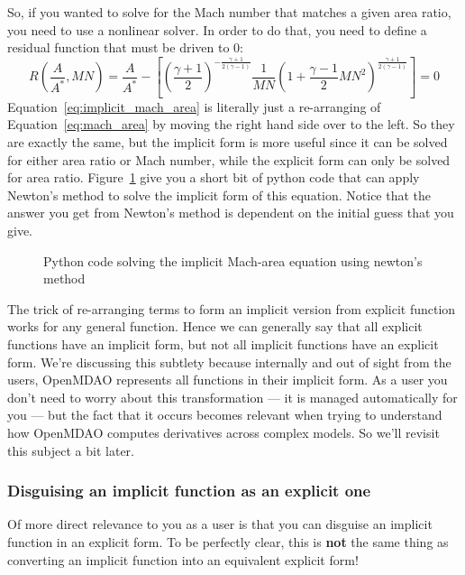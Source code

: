 \documentclass[conf]{new-aiaa}
\begin{document}
So, if you wanted to solve for the Mach number that matches a given area ratio, you need to use a nonlinear solver. 
In order to do that, you need to define a residual function that must be driven to 0: 
\begin{equation}
    R(\frac{A}{A^*}, MN) = \frac{A}{A^*} - \left[ \left(\frac{\gamma+1}{2}\right)^{-\frac{\gamma+1}{2(\gamma-1)}} 
                    \frac{1}{MN} 
                    \left( 1 + \frac{\gamma-1}{2}MN^2 \right)^{\frac{\gamma+1}{2(\gamma-1)}}\right] = 0
                    \label{eq:implicit_mach_area}
\end{equation}
Equation~\eqref{eq:implicit_mach_area} is literally just a re-arranging of Equation~\eqref{eq:mach_area} by moving the right hand side over to the left. 
So they are exactly the same, but the implicit form is more useful since it can be solved for either area ratio or Mach number, while the explicit form can only be solved for area ratio. 
Figure~\ref{fig:mach-area-implicit} give you a short bit of python code that can apply Newton's method to solve the implicit form of this equation. 
Notice that the answer you get from Newton's method is dependent on the initial guess that you give.
\begin{figure}[H]
    \centering
    
    \caption{Python code solving the implicit Mach-area equation using newton's method}
    \label{fig:mach-area-implicit}
\end{figure}

The trick of re-arranging terms to form an implicit version from explicit function works for any general function.
Hence we can generally say that all explicit functions have an implicit form, but not all implicit functions have an explicit form. 
We're discussing this subtlety because internally and out of sight from the users, OpenMDAO represents all functions in their implicit form. 
As a user you don't need to worry about this transformation --- it is managed automatically for you --- but the fact that it occurs becomes relevant when trying to understand how OpenMDAO computes derivatives across complex models.  
So we'll revisit this subject a bit later. 


\subsubsection*{Disguising an implicit function as an explicit one}
Of more direct relevance to you as a user is that you can disguise an implicit function in an explicit form. 
To be perfectly clear, this is \textbf{not} the same thing as converting an implicit function into an equivalent explicit form! 
\end{document}
